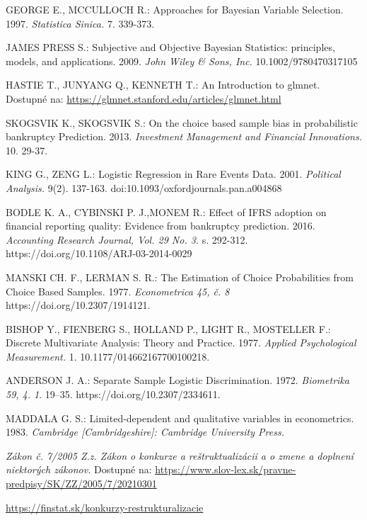 \begin{thebibliography}{99}
     GEORGE E., MCCULLOCH R.: Approaches for Bayesian Variable Selection. 1997. \emph{Statistica Sinica.} 7. 339-373.

     JAMES PRESS S.: Subjective and Objective Bayesian Statistics: principles, models, and applications. 2009. \emph{John Wiley \& Sons, Inc.} 10.1002/9780470317105

     HASTIE T., JUNYANG Q., KENNETH T.: An Introduction to glmnet. Dostupné na: \url{https://glmnet.stanford.edu/articles/glmnet.html}

     SKOGSVIK K., SKOGSVIK S.: On the choice based sample bias in probabilistic bankruptcy Prediction. 2013.
    \emph{Investment Management and Financial Innovations.} 10. 29-37.

     KING G., ZENG L.: Logistic Regression in Rare Events Data. 2001. \emph{Political Analysis.} 9(2). 137-163. doi:10.1093/oxfordjournals.pan.a004868
    
      BODLE K. A., CYBINSKI P. J.,MONEM R.: Effect of IFRS adoption on financial reporting quality: Evidence from bankruptcy prediction.
    2016. \emph{Accounting Research Journal, Vol. 29 No. 3.} s. 292-312. https://doi.org/10.1108/ARJ-03-2014-0029

     MANSKI CH. F., LERMAN S. R.: The Estimation of Choice Probabilities from Choice Based Samples. 1977. \emph{Econometrica 45, č. 8} https://doi.org/10.2307/1914121.

     BISHOP Y., FIENBERG S., HOLLAND P., LIGHT R., MOSTELLER F.: Discrete Multivariate Analysis: Theory and Practice. 1977. \emph{Applied Psychological Measurement.} 1. 10.1177/014662167700100218.

     ANDERSON J. A.: Separate Sample Logistic Discrimination. 1972. \emph{Biometrika 59, 4. 1}. 19–35. https://doi.org/10.2307/2334611.

     MADDALA G. S.: Limited-dependent and qualitative variables in econometrics. 1983. \emph{Cambridge [Cambridgeshire]: Cambridge University Press.}

     \emph{Zákon č. 7/2005 Z.z. Zákon o konkurze a reštruktualizácii a o zmene a doplnení niektorých zákonov.}
    Dostupné na: \url{https://www.slov-lex.sk/pravne-predpisy/SK/ZZ/2005/7/20210301}

     \url{https://finstat.sk/konkurzy-restrukturalizacie}

\end{thebibliography}
